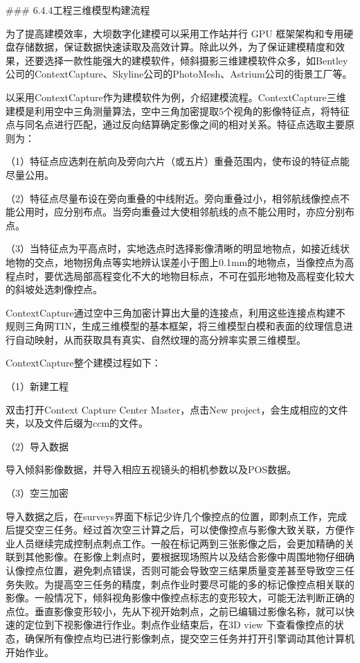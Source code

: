 \#\#\# 6.4.4工程三维模型构建流程

为了提高建模效率，大坝数字化建模可以采用工作站并行 GPU 框架架构和专用硬盘存储数据，保证数据快速读取及高效计算。除此以外，为了保证建模精度和效果，还要选择一款性能强大的建模软件，倾斜摄影三维建模软件众多，如Bentley公司的ContextCapture、Skyline公司的PhotoMesh、Astrium公司的街景工厂等。

以采用ContextCapture作为建模软件为例，介绍建模流程。ContextCapture三维建模是利用空中三角测量算法，空中三角加密提取5个视角的影像特征点，将特征点与同名点进行匹配，通过反向结算确定影像之间的相对关系。特征点选取主要原则为：

（1）特征点应选刺在航向及旁向六片（或五片）重叠范围内，使布设的特征点能尽量公用。

（2）特征点尽量布设在旁向重叠的中线附近。旁向重叠过小，相邻航线像控点不能公用时，应分别布点。当旁向重叠过大使相邻航线的点不能公用时，亦应分别布点。

（3）当特征点为平高点时，实地选点时选择影像清晰的明显地物点，如接近线状地物的交点，地物拐角点等实地辨认误差小于图上0.1mm的地物点，当像控点为高程点时，要优选局部高程变化不大的地物目标点，不可在弧形地物及高程变化较大的斜坡处选刺像控点。

ContextCapture通过空中三角加密计算出大量的连接点，利用这些连接点构建不规则三角网TIN，生成三维模型的基本框架，将三维模型白模和表面的纹理信息进行自动映射，从而获取具有真实、自然纹理的高分辨率实景三维模型。

ContextCapture整个建模过程如下：

（1）新建工程

双击打开Context Capture Center Master，点击New project，会生成相应的文件夹，以及文件后缀为ccm的文件。

（2）导入数据

导入倾斜影像数据，并导入相应五视镜头的相机参数以及POS数据。

（3）空三加密

导入数据之后，在surveys界面下标记少许几个像控点的位置，即刺点工作，完成后提交空三任务。经过首次空三计算之后，可以使像控点与影像大致关联，方便作业人员继续完成控制点刺点工作。一般在标记两到三张影像之后，会更加精确的关联到其他影像。在影像上刺点时，要根据现场照片以及结合影像中周围地物仔细确认像控点位置，避免刺点错误，否则可能会导致空三结果质量变差甚至导致空三任务失败。为提高空三任务的精度，刺点作业时要尽可能的多的标记像控点相关联的影像。一般情况下，倾斜视角影像中像控点标志的变形较大，可能无法判断正确的点位。垂直影像变形较小，先从下视开始刺点，之前已编辑过影像名称，就可以快速的定位到下视影像进行作业。刺点作业结束后，在3D view 下查看像控点的状态，确保所有像控点均已进行影像刺点，提交空三任务并打开引擎调动其他计算机开始作业。

